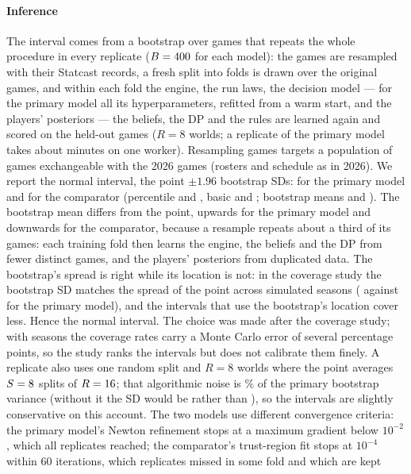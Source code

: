 \documentclass[aoas]{imsart}
\theoremstyle{plain}
\theoremstyle{definition}
\begin{document}
\paragraph{Inference} The interval comes from a bootstrap over games \citep{EfronTibshirani1993} that repeats the whole
procedure in every replicate ($B=400$ for each model): the games are
resampled with their Statcast records, a fresh split into folds is drawn over the original games, and within each fold
the engine, the run laws, the decision model --- for the primary model all its hyperparameters, refitted from a warm
start, and the players' posteriors --- the beliefs, the DP and the rules are learned again and scored on the held-out
games ($R=8$ worlds; a replicate of the primary model takes about \GapBootMinutes{} minutes on one worker). Resampling games targets
a population of games exchangeable with the 2026 games (rosters and schedule as in 2026). We report the normal interval, the point $\pm1.96$ bootstrap SDs: \GapCI{} for the primary model and \GapMainCI{} for
the comparator (percentile \GapPct{} and \GapMainPct, basic \GapBasic{} and \GapMainBasic; bootstrap means \GapBootMean{}
and \GapMainBootMean). The bootstrap mean differs from
the point, upwards for the primary model and downwards for the comparator, because a resample repeats about a third of
its games: each training fold then learns the engine, the beliefs and the DP from fewer distinct games, and the
players' posteriors from duplicated data. The bootstrap's spread is right while its location is not: in the coverage study the bootstrap SD matches the
spread of the point across simulated seasons (\CPPrimBootSD{} against \CPPrimPointSD{} for the primary model), and the
intervals that use the bootstrap's location cover less. Hence the normal interval. The choice was made after the coverage study; with \CPPrimS{} seasons the coverage rates
carry a Monte Carlo error of several percentage points, so the study ranks the intervals but does not calibrate them
finely. A replicate also uses one random split and $R=8$ worlds where the point averages $S=8$ splits of
$R=16$; that algorithmic noise is \GapAlgPct\% of the primary bootstrap variance (without it the SD would be
\GapBootSDAlg{} rather than \GapBootSD), so the intervals are slightly conservative on this account. The two models use different convergence criteria: the primary model's Newton refinement stops at a maximum
gradient below $10^{-2}$, which all \GapB{} replicates reached; the comparator's trust-region fit stops at $10^{-4}$
within 60 iterations, which \GapMainBFail{} replicates missed in some fold and which are kept
\end{document}
